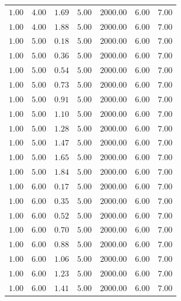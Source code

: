 \begin{longtable}[c]{lllllll}
   $1.00$  & $4.00$  & $1.69$   & $5.00$ & $2000.00$ & $6.00$               & $7.00$      \\
   $1.00$  & $4.00$  & $1.88$   & $5.00$ & $2000.00$ & $6.00$               & $7.00$      \\
   $1.00$  & $5.00$  & $0.18$   & $5.00$ & $2000.00$ & $6.00$               & $7.00$      \\
   $1.00$  & $5.00$  & $0.36$   & $5.00$ & $2000.00$ & $6.00$               & $7.00$      \\
   $1.00$  & $5.00$  & $0.54$   & $5.00$ & $2000.00$ & $6.00$               & $7.00$      \\
   $1.00$  & $5.00$  & $0.73$   & $5.00$ & $2000.00$ & $6.00$               & $7.00$      \\
   $1.00$  & $5.00$  & $0.91$   & $5.00$ & $2000.00$ & $6.00$               & $7.00$      \\
   $1.00$  & $5.00$  & $1.10$   & $5.00$ & $2000.00$ & $6.00$               & $7.00$      \\
   $1.00$  & $5.00$  & $1.28$   & $5.00$ & $2000.00$ & $6.00$               & $7.00$      \\
   $1.00$  & $5.00$  & $1.47$   & $5.00$ & $2000.00$ & $6.00$               & $7.00$      \\
   $1.00$  & $5.00$  & $1.65$   & $5.00$ & $2000.00$ & $6.00$               & $7.00$      \\
   $1.00$  & $5.00$  & $1.84$   & $5.00$ & $2000.00$ & $6.00$               & $7.00$      \\
   $1.00$  & $6.00$  & $0.17$   & $5.00$ & $2000.00$ & $6.00$               & $7.00$      \\
   $1.00$  & $6.00$  & $0.35$   & $5.00$ & $2000.00$ & $6.00$               & $7.00$      \\
   $1.00$  & $6.00$  & $0.52$   & $5.00$ & $2000.00$ & $6.00$               & $7.00$      \\
   $1.00$  & $6.00$  & $0.70$   & $5.00$ & $2000.00$ & $6.00$               & $7.00$      \\
   $1.00$  & $6.00$  & $0.88$   & $5.00$ & $2000.00$ & $6.00$               & $7.00$      \\
   $1.00$  & $6.00$  & $1.06$   & $5.00$ & $2000.00$ & $6.00$               & $7.00$      \\
   $1.00$  & $6.00$  & $1.23$   & $5.00$ & $2000.00$ & $6.00$               & $7.00$      \\
   $1.00$  & $6.00$  & $1.41$   & $5.00$ & $2000.00$ & $6.00$               & $7.00$      \\

\end{longtable}
